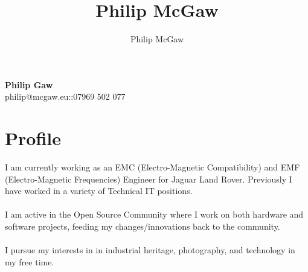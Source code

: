 \documentclass[a4paper]{article}
\title{Philip McGaw}
\author{Philip McGaw}
\date{}
\makeatletter
\newcommand{\name}{Philip \Mc Gaw}
\newcommand{\email}{philip@mcgaw.eu}
\newcommand{\phone}{07969 502 077}
\makeatother
\begin{document}
\begin{center}
    {\bfseries\Huge\name} \\
    \email\hspace{1em}::\hspace{1em}\phone
\end{center}

\section{Profile}
I am currently working as an EMC (Electro-Magnetic Compatibility) and EMF (Electro-Magnetic Frequencies) Engineer for Jaguar Land Rover. Previously I have worked in a variety of Technical IT positions. \\ \\
I am active in the Open Source Community where I work on both hardware and software projects, feeding my changes/innovations back to the community.\\ \\
I pursue my interests in in industrial heritage, photography, and technology in my free time.
\end{document}
